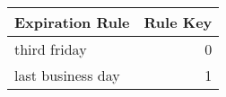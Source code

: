 \begin{tabular}{lr}
\toprule
  Expiration Rule &  Rule Key \\
\midrule
     third friday &         0 \\
last business day &         1 \\
\bottomrule
\end{tabular}
